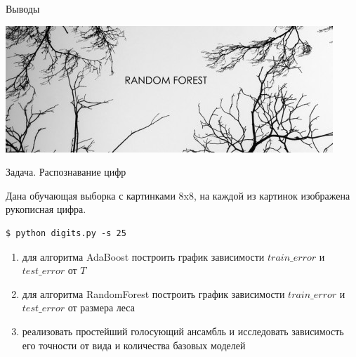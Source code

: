 \documentclass[10pt,a4paper]{beamer}
\begin{document}

\begin{frame}{Выводы}

\begin{center}
\includegraphics[scale=0.65]{images/forest.jpg}
\end{center}

\end{frame}


\begin{frame}[fragile]{Задача. Распознавание цифр}

Дана обучающая выборка с картинками 8x8, на каждой из картинок изображена рукописная цифра.

\begin{shaded}
{\color{green} \begin{verbatim}
$ python digits.py -s 25
\end{verbatim}}
\end{shaded}

\begin{enumerate}
\item для алгоритма AdaBoost построить график зависимости $train\_error$ и $test\_error$ от $T$
\item для алгоритма RandomForest построить график зависимости $train\_error$ и $test\_error$ от размера леса
\item реализовать простейший голосующий ансамбль и исследовать зависимость его точности от вида и количества базовых моделей
\end{enumerate}

\end{frame}

\end{document}
